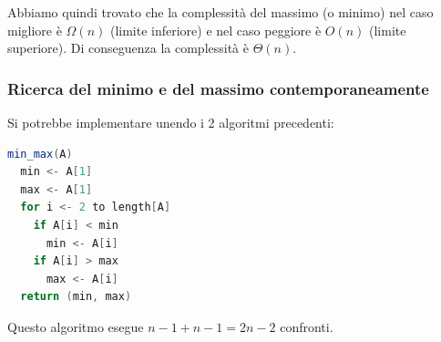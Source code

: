 \documentclass[a4paper]{article}
\begin{document}
\vspace{1em}
\noindent
Abbiamo quindi trovato che la complessità del massimo (o minimo) nel caso migliore è
\( \Omega(n) \) (limite inferiore) e nel caso peggiore è \( O(n) \) (limite superiore).
Di conseguenza la complessità è \( \Theta(n) \).

\subsubsection{Ricerca del minimo e del massimo contemporaneamente}
Si potrebbe implementare unendo i 2 algoritmi precedenti:
\begin{lstlisting}[language=Scala]
min_max(A)
  min <- A[1]
  max <- A[1]
  for i <- 2 to length[A]
    if A[i] < min
      min <- A[i]
    if A[i] > max
      max <- A[i]
  return (min, max)
\end{lstlisting}
Questo algoritmo esegue \( n-1 + n-1 = 2n-2 \) confronti.
\end{document}
